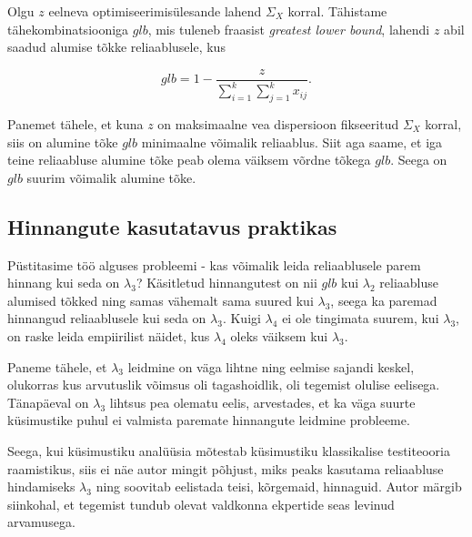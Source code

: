 \documentclass[a4paper,12pt,oneside]{article}
\numberwithin{equation}{section}
\theoremstyle{definition}
\begin{document}
Olgu $z$ eelneva optimiseerimis\"ulesande lahend $\Sigma_X$ korral. Tähistame tähekombinatsiooniga $glb$, mis tuleneb fraasist \textit{greatest lower bound}, lahendi $z$ abil saadud alumise tõkke reliaablusele, kus 

\begin{equation*}
glb = 1 - \frac{z}{\sum \limits_{i=1}^k \sum \limits_{j=1}^k x_{ij}} \text{.}
\end{equation*}  

Panemet tähele, et kuna $z$ on maksimaalne vea dispersioon fikseeritud $\Sigma_X$ korral, siis on alumine tõke $glb$ minimaalne võimalik reliaablus. Siit aga saame, et iga teine reliaabluse alumine tõke peab olema väiksem võrdne tõkega $glb$. Seega on $glb$ suurim võimalik alumine tõke. 

\subsection{Hinnangute kasutatavus praktikas}

Püstitasime töö alguses probleemi - kas võimalik leida reliaablusele parem hinnang kui seda on $\lambda_3$? Käsitletud hinnangutest on nii $glb$ kui $\lambda_2$ reliaabluse alumised tõkked ning samas vähemalt sama suured kui $\lambda_3$, seega ka paremad hinnangud reliaablusele kui seda on $\lambda_3$. Kuigi $\lambda_4$ ei ole tingimata suurem, kui $\lambda_3$, on raske leida empiirilist näidet, kus $\lambda_4$ oleks väiksem kui $\lambda_3$.

Paneme tähele, et $\lambda_3$ leidmine on väga lihtne ning eelmise sajandi keskel, olukorras kus arvutuslik võimsus oli tagashoidlik, oli tegemist olulise eelisega. Tänapäeval on $\lambda_3$ lihtsus pea olematu eelis, arvestades, et ka väga suurte küsimustike puhul ei valmista paremate hinnangute leidmine probleeme. 

Seega, kui küsimustiku analüüsia mõtestab küsimustiku klassikalise testiteooria raamistikus, siis ei näe autor mingit põhjust, miks peaks kasutama reliaabluse hindamiseks $\lambda_3$ ning soovitab eelistada teisi, kõrgemaid, hinnaguid. Autor märgib siinkohal, et tegemist tundub olevat valdkonna ekpertide seas levinud arvamusega.  \cite{Revelle2008} \cite{Sijtsma2009a} \cite{Cronbach2004}
\end{document}
